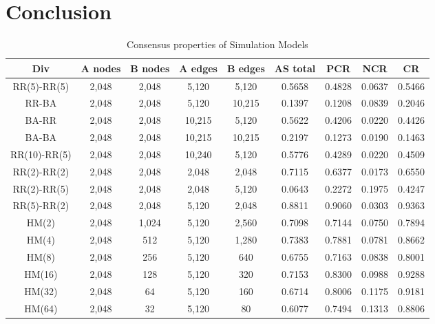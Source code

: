 \section{Conclusion}
\begin{table}[!htb]
	\scriptsize
	\centering
    \caption{Consensus properties of Simulation Models}
	\label{Consensus properties of Simulation Models}
	\begin{center}
		\begin{tabular}{c|c|c|c|c|c|c|c|c} \hline\hline
			Div                    & A nodes& B nodes & A edges & B edges & AS total  & PCR    & NCR    & CR       \\ \hline \hline
			RR(5)-RR(5)            & 2,048  & 2,048   & 5,120   & 5,120   & 0.5658    & 0.4828 & 0.0637 & 0.5466   \\ \hline
			RR-BA             	   & 2,048 	& 2,048   & 5,120   & 10,215  & 0.1397    & 0.1208 & 0.0839 & 0.2046   \\ \hline 
			BA-RR             	   & 2,048 	& 2,048   & 10,215  & 5,120   & 0.5622    & 0.4206 & 0.0220 & 0.4426   \\ \hline
			BA-BA             	   & 2,048 	& 2,048   & 10,215  & 10,215  & 0.2197    & 0.1273 & 0.0190 & 0.1463   \\ \hline
			RR(10)-RR(5)      	   & 2,048 	& 2,048   & 10,240  & 5,120   & 0.5776    & 0.4289 & 0.0220 & 0.4509   \\ \hline
			RR(2)-RR(2)            & 2,048 	& 2,048   & 2,048   & 2,048   & 0.7115    & 0.6377 & 0.0173 & 0.6550   \\ \hline 
			RR(2)-RR(5)            & 2,048 	& 2,048   & 2,048   & 5,120   & 0.0643    & 0.2272 & 0.1975 & 0.4247   \\ \hline 
			RR(5)-RR(2)            & 2,048 	& 2,048   & 5,120   & 2,048   & 0.8811    & 0.9060 & 0.0303 & 0.9363   \\ \hline
			HM(2)  				   & 2,048 	& 1,024   & 5,120   & 2,560   & 0.7098    & 0.7144 & 0.0750 & 0.7894   \\ \hline    
			HM(4) 				   & 2,048 	&  512    & 5,120   & 1,280   & 0.7383    & 0.7881 & 0.0781 & 0.8662   \\ \hline
			HM(8)  				   & 2,048 	&  256    & 5,120   & 640     & 0.6755    & 0.7163 & 0.0838 & 0.8001   \\ \hline
			HM(16)				   & 2,048 	&  128    & 5,120   & 320     & 0.7153    & 0.8300 & 0.0988 & 0.9288   \\ \hline
			HM(32) 				   & 2,048 	&   64    & 5,120   & 160     & 0.6714    & 0.8006 & 0.1175 & 0.9181   \\ \hline
			HM(64) 				   & 2,048 	&   32    & 5,120   & 80      & 0.6077    & 0.7494 & 0.1313 & 0.8806   \\ \hline  \hline
		\end{tabular}

	\end{center}
\end{table} 


